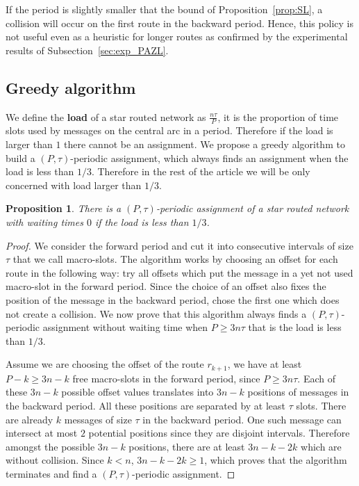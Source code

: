\documentclass[10pt, conference, letterpaper]{IEEEtran}
\newtheorem{proposition}{Proposition}
\begin{document}
      If the period is slightly smaller that the bound of Proposition~\ref{prop:SL}, a collision will occur on the first route in the backward period. Hence, this policy is not useful even as a heuristic for longer routes as confirmed by the experimental results of Subsection~\ref{sec:exp_PAZL}. 

   
    \subsection{Greedy algorithm}
    
    
      We define the \textbf{load} of a star routed network as $\frac{n\tau}{P}$, it is the proportion of time slots used by messages on the central arc in a period. Therefore if the load is larger than $1$ there cannot be an assignment. We propose a greedy algorithm to build a $(P,\tau)$-periodic assignment, which always finds an assignment when the load is less than $1/3$. Therefore in the rest of the article we will be only concerned with load larger than $1/3$.
    
    \begin{proposition}
    There is a $(P,\tau)$-periodic assignment of a star routed network with waiting times $0$ if the load is less than $1/3$.
    \end{proposition}
    \begin{proof}
     We consider the forward period and cut it into consecutive intervals of size $\tau$ that we call macro-slots. The algorithm works by choosing an offset for each route in the following way: try all offsets which put the message in a yet not used macro-slot in the forward
     period. Since the choice of an offset also fixes the position of the message in the backward period, chose the first one which does not create a collision. We now prove that this algorithm always finds a $(P,\tau)$-periodic assignment without waiting time when $P \geq 3n\tau$ that is the load is less than $1/3$.
     
     Assume we are choosing the offset of the route $r_{k+1}$, we have at least $P - k \geq 3n - k$ free macro-slots in the forward period, since $P \geq 3n\tau$. Each of these $3n - k$ possible offset values translates into $3n - k$ positions of messages in the backward period. All these positions are separated by at least $\tau$ slots. There are already $k$ messages of size $\tau$ in the backward period. One such message can intersect at most $2$ potential positions since they are disjoint intervals. Therefore  amongst the possible $3n - k$ positions, there are  at least $3n - k -2k$ which are without collision. Since $k < n$, $3n - k -2k \geq 1$, which proves that the algorithm terminates and find a  $(P,\tau)$-periodic assignment. 
%      
     \end{proof}
     
\end{document}

